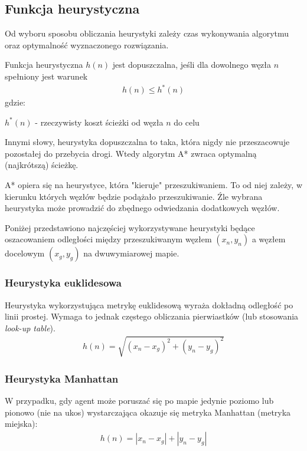 \subsection{Funkcja heurystyczna}
\label{ch:astar_heurystyki}
Od wyboru sposobu obliczania heurystyki zależy czas wykonywania algorytmu oraz optymalność wyznaczonego rozwiązania.

Funkcja heurystyczna $h(n)$ jest dopuszczalna, jeśli dla dowolnego węzła $n$ spełniony jest warunek
\begin{gather}
 	h(n) \leq h^*(n)
 	\label{eq_astar_heurystyka_admissible} 
\end{gather}
 gdzie:

 $h^*(n)$ - rzeczywisty koszt ścieżki od węzła $n$ do celu

Innymi słowy, heurystyka dopuszczalna to taka, która nigdy nie przeszacowuje pozostałej do przebycia drogi. Wtedy algorytm A* zwraca optymalną (najkrótszą) ścieżkę. \cite{cooppath}

A* opiera się na heurystyce, która "kieruje" przeszukiwaniem.
To od niej zależy, w kierunku których węzłów będzie podążało przeszukiwanie.
Źle wybrana heurystyka może prowadzić do zbędnego odwiedzania dodatkowych węzłów.

Poniżej przedstawiono najczęściej wykorzystywane heurystyki będące oszacowaniem odległości między przeszukiwanym węzłem $(x_n, y_n)$ a węzłem docelowym $(x_g, y_g)$ na dwuwymiarowej mapie.

\subsubsection{Heurystyka euklidesowa}
Heurystyka wykorzystująca metrykę euklidesową wyraża dokładną odległość po linii prostej. Wymaga to jednak częstego obliczania pierwiastków (lub stosowania {\it look-up table}).
\begin{gather}
 	h(n) = \sqrt{(x_n - x_g)^2 + (y_n - y_g)^2}
 	\label{eq_astar_heu_euc} 
\end{gather}

\subsubsection{Heurystyka Manhattan}
W przypadku, gdy agent może poruszać się po mapie jedynie poziomo lub pionowo (nie na ukos) wystarczająca okazuje się metryka Manhattan (metryka miejska):
\begin{gather}
 	h(n) = |x_n - x_g| + |y_n - y_g|
 	\label{eq_astar_heu_man} 
\end{gather}

